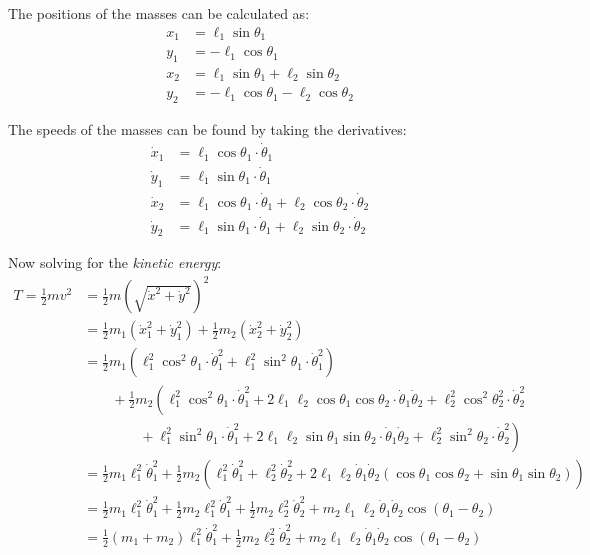 \documentclass[letterpaper,8pt]{article}
\begin{document}
The positions of the masses can be calculated as:
\begin{align*}
x_1 &= \ell_1 \sin \theta_1  \\
y_1 &= -\ell_1 \cos \theta_1 \\
x_2 &= \ell_1 \sin \theta_1 + \ell_2 \sin \theta_2 \\
y_2 &= -\ell_1 \cos \theta_1 - \ell_2 \cos \theta_2
\end{align*}

The speeds of the masses can be found by taking the derivatives:
\begin{align*}
\dot{x}_1 &= \ell_1 \cos \theta_1 \cdot \dot{\theta}_1 \\
\dot{y}_1 &= \ell_1 \sin \theta_1 \cdot \dot{\theta}_1 \\
\dot{x}_2 &= \ell_1 \cos \theta_1 \cdot \dot{\theta}_1 + \ell_2 \cos \theta_2 \cdot \dot{\theta}_2 \\
\dot{y}_2 &= \ell_1 \sin \theta_1 \cdot \dot{\theta}_1 + \ell_2 \sin \theta_2 \cdot \dot{\theta}_2
\end{align*}

Now solving for the \emph{kinetic energy}:
\begin{align*}
T = \frac{1}{2} mv^2 &= \frac{1}{2} m \left( \sqrt{\dot{x}^2 + \dot{y}^2 }\right)^2 \\
  &= \frac{1}{2} m_1 \left( \dot{x}_1^2 + \dot{y}_1^2 \right) + \frac{1}{2} m_2 \left( \dot{x}_2^2 + \dot{y}_2^2 \right) \\
  &= \frac{1}{2} m_1 \left( \ell_1^2 \cos^2 \theta_1 \cdot \dot{\theta}_1^2 + \ell_1^2 \sin^2 \theta_1 \cdot \dot{\theta}_1^2 \right) \\
  &\qquad + \frac{1}{2} m_2 \left( \ell_1^2 \cos^2 \theta_1 \cdot \dot{\theta}_1^2 + 2 \ell_1\ell_2 \cos \theta_1 \cos \theta_2 \cdot \dot{\theta}_1\dot{\theta}_2 
          + \ell_2^2 \cos^2 \theta_2^2 \cdot \dot{\theta}_2^2 \right. \\
  &\qquad\qquad  +  \left.\ell_1^2 \sin^2 \theta_1 \cdot \dot{\theta}_1^2 + 2 \ell_1\ell_2 \sin \theta_1 \sin \theta_2 \cdot \dot{\theta}_1 \dot{\theta}_2 
              + \ell_2^2 \sin^2 \theta_2 \cdot \dot{\theta}_2^2 \right) \\
  &= \frac{1}{2} m_1 \ell_1^2 \dot{\theta}_1^2 + \frac{1}{2} m_2 \left( \ell_1^2 \dot{\theta}_1^2 + \ell_2^2 \dot{\theta}_2^2 
              + 2 \ell_1\ell_2 \dot{\theta}_1 \dot{\theta}_2 ( \cos \theta_1 \cos \theta_2 + \sin \theta_1 \sin \theta_2 ) \right) \\
  &= \frac{1}{2} m_1 \ell_1^2 \dot{\theta}_1^2 + \frac{1}{2} m_2 \ell_1^2 \dot{\theta}_1^2 + \frac{1}{2} m_2 \ell_2^2 \dot{\theta}_2^2 
              + m_2 \ell_1\ell_2 \dot{\theta}_1 \dot{\theta}_2 \cos (\theta_1 - \theta_2) \\
  &= \frac{1}{2} (m_1 + m_2) \ell_1^2 \dot{\theta}_1^2 + \frac{1}{2} m_2 \ell_2^2 \dot{\theta}_2^2 
              + m_2 \ell_1\ell_2 \dot{\theta}_1 \dot{\theta}_2 \cos (\theta_1 - \theta_2) \\
\end{align*}
\end{document}
